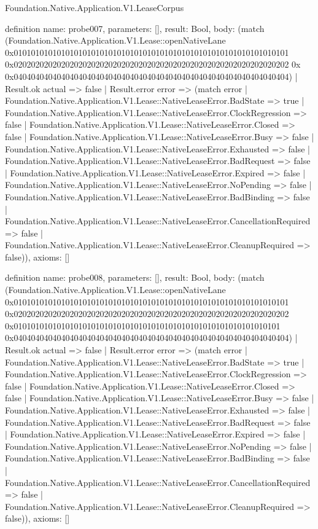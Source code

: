 \begin{lexlean}{Foundation.Native.Application.V1.LeaseCorpus}
\begin{semanticmodule}
definition{
  name: probe007,
  parameters: [],
  result: Bool,
  body: (match (Foundation.Native.Application.V1.Lease::openNativeLane 0x0101010101010101010101010101010101010101010101010101010101010101 0x0202020202020202020202020202020202020202020202020202020202020202 0x 0x0404040404040404040404040404040404040404040404040404040404040404)
    | Result.ok actual => false
    | Result.error error => (match error
      | Foundation.Native.Application.V1.Lease::NativeLeaseError.BadState => true
      | Foundation.Native.Application.V1.Lease::NativeLeaseError.ClockRegression => false
      | Foundation.Native.Application.V1.Lease::NativeLeaseError.Closed => false
      | Foundation.Native.Application.V1.Lease::NativeLeaseError.Busy => false
      | Foundation.Native.Application.V1.Lease::NativeLeaseError.Exhausted => false
      | Foundation.Native.Application.V1.Lease::NativeLeaseError.BadRequest => false
      | Foundation.Native.Application.V1.Lease::NativeLeaseError.Expired => false
      | Foundation.Native.Application.V1.Lease::NativeLeaseError.NoPending => false
      | Foundation.Native.Application.V1.Lease::NativeLeaseError.BadBinding => false
      | Foundation.Native.Application.V1.Lease::NativeLeaseError.CancellationRequired => false
      | Foundation.Native.Application.V1.Lease::NativeLeaseError.CleanupRequired => false)),
  axioms: []
}

definition{
  name: probe008,
  parameters: [],
  result: Bool,
  body: (match (Foundation.Native.Application.V1.Lease::openNativeLane 0x0101010101010101010101010101010101010101010101010101010101010101 0x0202020202020202020202020202020202020202020202020202020202020202 0x01010101010101010101010101010101010101010101010101010101010101 0x0404040404040404040404040404040404040404040404040404040404040404)
    | Result.ok actual => false
    | Result.error error => (match error
      | Foundation.Native.Application.V1.Lease::NativeLeaseError.BadState => true
      | Foundation.Native.Application.V1.Lease::NativeLeaseError.ClockRegression => false
      | Foundation.Native.Application.V1.Lease::NativeLeaseError.Closed => false
      | Foundation.Native.Application.V1.Lease::NativeLeaseError.Busy => false
      | Foundation.Native.Application.V1.Lease::NativeLeaseError.Exhausted => false
      | Foundation.Native.Application.V1.Lease::NativeLeaseError.BadRequest => false
      | Foundation.Native.Application.V1.Lease::NativeLeaseError.Expired => false
      | Foundation.Native.Application.V1.Lease::NativeLeaseError.NoPending => false
      | Foundation.Native.Application.V1.Lease::NativeLeaseError.BadBinding => false
      | Foundation.Native.Application.V1.Lease::NativeLeaseError.CancellationRequired => false
      | Foundation.Native.Application.V1.Lease::NativeLeaseError.CleanupRequired => false)),
  axioms: []
}


\end{semanticmodule}
\end{lexlean}
